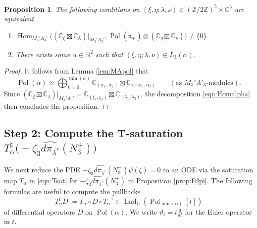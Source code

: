 \documentclass[a4paper,11pt,reqno]{amsart}
\newcommand{\frakn}{\mathfrak{n}}
\newcommand{\CC}{\mathbb{C}}
\newcommand{\NN}{\mathbb{N}}
\newcommand{\ZZ}{\mathbb{Z}}
\newcommand{\0}{{\bf 0}}
\newcommand{\C}{\mathbb{C}}
\newcommand{\1}{{\bf 1}}
\DeclareMathOperator{\End}{End}
\DeclareMathOperator{\Hom}{Hom}
\DeclareMathOperator{\Pol}{Pol}
\theoremstyle{plain}
\newtheorem{proposition}[equation]{Proposition}
\theoremstyle{definition}
\numberwithin{equation}{section}
\theoremstyle{definition}
\begin{document}
\begin{proposition}\label{prop:Invariants_SB3} 
The following conditions on $(\xi, \eta; \lambda, \nu)\in (\ZZ/2\ZZ)^5\times \CC^5$ are equivalent.
\begin{enumerate}[label=\normalfont{(\roman*)}]
    \item $\Hom_{M_3'A_3'}\big((\CC_\xi\boxtimes \CC_{\lambda})\big\rvert_{M_3'A_3'},\Pol(\frakn_+)\otimes (\CC_\eta\boxtimes \CC_{\nu})\big)\neq \{0\}$.
    \item There exists some $\alpha\in \NN^2$ such that 
    $(\xi, \eta; \lambda, \nu) \in L_3(\alpha)$.
\end{enumerate}
\end{proposition}

\begin{proof}
It follows from Lemma \ref{lem:MApol} that
\begin{equation*}
\Pol(\alpha) \simeq \bigoplus_{k=0}^{\min(\alpha)} 
\C_{(\alpha_1,\, \alpha_2)} 
\boxtimes \C_{(-\alpha_1, \alpha_2)} \qquad (\text{as $M_3'A'_3$-modules}).
\end{equation*}
Since 
$(\CC_\xi\boxtimes \CC_{\lambda})\big\rvert_{M_3'A_3'}
=\CC_{(\xi_1,\xi_3)}\boxtimes \CC_{(\lambda_1,\lambda_3)}$,
the decomposition \eqref{eqn:Homalpha} then concludes the proposition.
\end{proof}


\subsection{Step 2: 
Compute the T-saturation
\texorpdfstring{$T_\alpha^\sharp \big(-\zeta_3\widehat{d\pi_{\lambda^*}}(N_3^+)\big)$}{ }}
\label{sec:Step2}

We next reduce the PDE $-\zeta_3\widehat{d\pi_{\lambda^*}}(N_3^+)\psi(\zeta) = 0$ to an ODE via the saturation map $T_\alpha$ in \eqref{eqn:Tsat}
for $-\zeta_3\widehat{d\pi_{\lambda^*}}(N_3^+)$ in Proposition \ref{prop:Fdpi}.
The following formulas are useful to compute 
the pullbacks 
\begin{equation*}
T_\alpha^\sharp D:=
T_\alpha \circ D \circ T_\alpha^{-1}
\in \End_\C(\Pol_{\min(\alpha)}[t])
\end{equation*}
of differential operators $D$ on $\Pol(\alpha)$.
We write $\vartheta_t=t\frac{d}{dt}$ for the Euler operator in $t$. 
\end{document}
